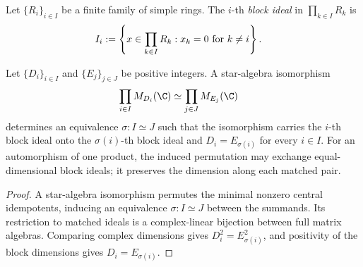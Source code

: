 \begin{definition}\label{def:block_ideal}
    \leanok
    Let $\{R_i\}_{i\in I}$ be a finite family of simple rings. The $i$-th
    \emph{block ideal} in $\prod_{k\in I}R_k$ is
    \begin{align}
        I_i
        &:=\left\{x \in \prod_{k\in I}R_k :
            x_k = 0 \text{ for } k \neq i\right\}.
        \notag
    \end{align}
\end{definition}

\begin{theorem}\label{thm:dim_preserved}
    \leanok
    Let $\{D_i\}_{i\in I}$ and $\{E_j\}_{j\in J}$ be positive integers.
    A star-algebra isomorphism
    \begin{align}
        \prod_{i\in I} M_{D_i}(\C)
         & \simeq \prod_{j\in J} M_{E_j}(\C)
        \notag
    \end{align}
    determines an equivalence $\sigma:I\simeq J$ such that the isomorphism
    carries the $i$-th block ideal onto the $\sigma(i)$-th block ideal and
    $D_i=E_{\sigma(i)}$ for every $i\in I$. For an automorphism of one product,
    the induced permutation may exchange equal-dimensional block ideals; it
    preserves the dimension along each matched pair.
\end{theorem}

\begin{proof}\leanok
    A star-algebra isomorphism permutes the minimal nonzero central
    idempotents, inducing an equivalence $\sigma:I\simeq J$ between the
    summands. Its restriction to matched ideals is a complex-linear bijection
    between full matrix algebras. Comparing complex dimensions gives
    $D_i^2=E_{\sigma(i)}^2$, and positivity of the block dimensions gives
    $D_i=E_{\sigma(i)}$.
\end{proof}

